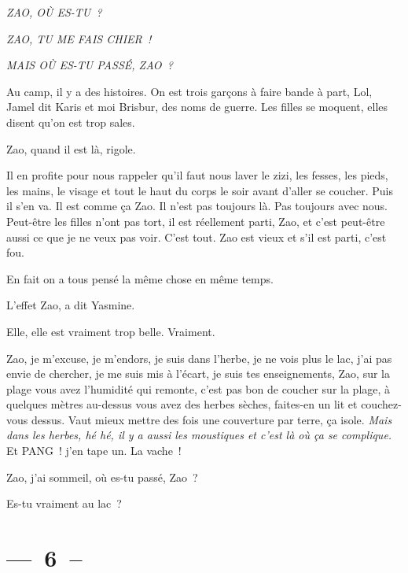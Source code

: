 \documentclass[french,twoside]{book} %
\begin{document}
{\itshape ZAO, OÙ ES-TU ?}\par
{\itshape ZAO, TU ME FAIS CHIER !}\par
{\itshape MAIS OÙ ES-TU PASSÉ, ZAO ?}\par
\bigbreak
\noindent Au camp, il y a des histoires. On est trois garçons à faire bande à part, Lol, Jamel dit Karis et moi Brisbur, des noms de guerre. Les filles se moquent, elles disent qu’on est trop sales.\par
Zao, quand il est là, rigole.\par
Il en profite pour nous rappeler qu’il faut nous laver le zizi, les fesses, les pieds, les mains, le visage et tout le haut du corps le soir avant d’aller se coucher. Puis il s’en va. Il est comme ça Zao. Il n’est pas toujours là. Pas toujours avec nous. Peut-être les filles n’ont pas tort, il est réellement parti, Zao, et c’est peut-être aussi ce que je ne veux pas voir. C’est tout. Zao est vieux et s’il est parti, c’est fou.\par
\bigbreak
En fait on a tous pensé la même chose en même temps.\par
L’effet Zao, a dit Yasmine.\par
Elle, elle est vraiment trop belle. Vraiment.\par
Zao, je m’excuse, je m’endors, je suis dans l’herbe, je ne vois plus le lac, j’ai pas envie de chercher, je me suis mis à l’écart, je suis tes enseignements, Zao, sur la plage vous avez l’humidité qui remonte, c’est pas bon de coucher sur la plage, à quelques mètres au-dessus vous avez des herbes sèches, faites-en un lit et couchez-vous dessus. Vaut mieux mettre des fois une couverture par terre, ça isole. \emph{Mais dans les herbes, hé hé, il y a aussi les moustiques et c’est là où ça se complique.} Et PANG ! j’en tape un. La vache !\par
\bigbreak
Zao, j’ai sommeil, où es-tu passé, Zao ?\par
Es-tu vraiment au lac ?
\section[{— 6 –}]{— 6 –}\renewcommand{\leftmark}{— 6 –}
\end{document}
